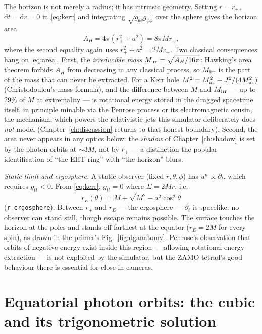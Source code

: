 The horizon is not merely a radius; it has intrinsic geometry. Setting
$r = r_+$, $\mathrm{d}t = \mathrm{d}r = 0$ in \eqref{eq:kerr} and
integrating $\sqrt{g_{\theta\theta}g_{\phi\phi}}$ over the sphere gives
the horizon area
\begin{equation}
A_H = 4\pi\left(r_+^2 + a^2\right) = 8\pi M r_+ ,
\label{eq:area}
\end{equation}
where the second equality again uses $r_+^2 + a^2 = 2Mr_+$. Two
classical consequences hang on \eqref{eq:area}. First, the
\emph{irreducible mass} $M_{\rm irr} = \sqrt{A_H/16\pi}$: Hawking's
area theorem forbids $A_H$ from decreasing in any classical process, so
$M_{\rm irr}$ is the part of the mass that can never be extracted. For
a Kerr hole $M^2 = M_{\rm irr}^2 + J^2/(4M_{\rm irr}^2)$
(Christodoulou's mass formula), and the difference between $M$ and
$M_{\rm irr}$ — up to $29\%$ of $M$ at extremality — is rotational
energy stored in the dragged spacetime itself, in principle minable via
the Penrose process \citep{Penrose1969} or its electromagnetic cousin,
the \citet{BlandfordZnajek1977} mechanism, which powers the relativistic
jets this simulator deliberately does \emph{not} model
(Chapter~\ref{ch:discussion} returns to that honest boundary). Second,
the area never appears in any optics below: the \emph{shadow} of
Chapter~\ref{ch:shadow} is set by the photon orbits at
$\sim\!3M$, not by $r_+$ — a distinction the popular identification of
``the EHT ring'' with ``the horizon'' blurs.

\emph{Static limit and ergosphere.} A static observer (fixed $r, \theta,
\phi$) has $u^\mu \propto \partial_t$, which requires $g_{tt} < 0$.
From \eqref{eq:kerr}, $g_{tt} = 0$ where $\Sigma = 2Mr$, i.e.
\begin{equation}
r_E(\theta) = M + \sqrt{M^2 - a^2\cos^2\theta}
\label{eq:ergo}
\end{equation}
(\texttt{r\_ergosphere}). Between $r_+$ and $r_E$ — the ergosphere —
$\partial_t$ is spacelike: no observer can stand still, though escape
remains possible. The surface touches the horizon at the poles and
stands off farthest at the equator ($r_E = 2M$ for every spin), as drawn
in the primer's Fig.~\ref{fig:dganatomy}. Penrose's observation that
orbits of negative energy exist inside this region — allowing rotational
energy extraction — is not exploited by the simulator, but the ZAMO
tetrad's good behaviour there is essential for close-in cameras.

\section{Equatorial photon orbits: the cubic and its trigonometric
solution}
\label{sec:photonorbit}

